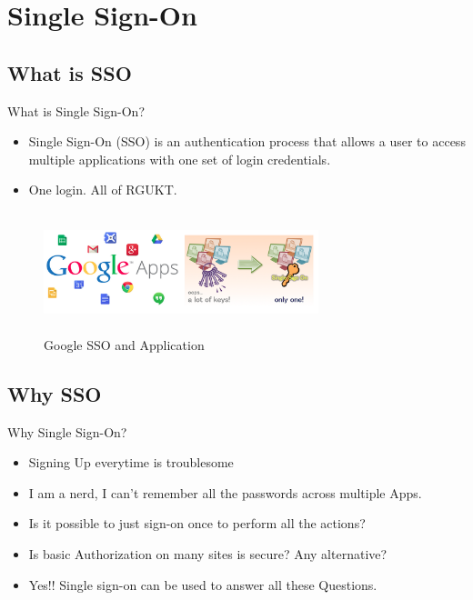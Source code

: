 \documentclass[10pt,xcolor=dvipsnames]{beamer}
\begin{document}
\section{Single Sign-On}
\subsection{What is SSO}
\begin{frame}{What is Single Sign-On?}
 
\begin{itemize}
	\item Single Sign-On (SSO) is an authentication process that allows a user to access multiple applications with one set of login credentials. 
	\item One login. All of RGUKT.
\end{itemize}

\begin{figure}
\includegraphics[width=8cm,height=3.5cm]{SSO}
\caption{Google SSO and Application \label{fig:Google SSO and Application}}
\end{figure}

\end{frame}
\subsection{Why SSO}
\begin{frame}{Why Single Sign-On?}

\begin{itemize}
	\item Signing Up everytime is troublesome
	\item I am a nerd, I can't remember all the passwords across multiple Apps.
	\item Is it possible to just sign-on once to perform all the actions?
	\item Is basic Authorization on many sites is secure? Any alternative?
	\item Yes!! Single sign-on can be used to answer all these Questions.
\end{itemize}

\end{frame}
\end{document}
